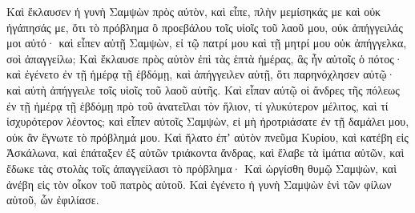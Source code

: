 {Καὶ ἔκλαυσεν ἡ γυνὴ Σαμψὼν πρὸς αὐτὸν, καὶ εἶπε, πλὴν μεμίσηκάς με καὶ οὐκ ἠγάπησάς με, ὅτι τὸ πρόβλημα ὃ προεβάλου τοῖς υἱοῖς τοῦ λαοῦ μου, οὐκ ἀπήγγειλάς μοι αὐτό· καὶ εἶπεν αὐτῇ Σαμψὼν, εἰ τῷ πατρί μου καὶ τῇ μητρί μου οὐκ ἀπήγγελκα, σοὶ ἀπαγγείλω;
Καὶ ἔκλαυσε πρὸς αὐτὸν ἐπὶ τὰς ἑπτὰ ἡμέρας, ἃς ἦν αὐτοῖς ὁ πότος· καὶ ἐγένετο ἐν τῇ ἡμέρᾳ τῇ ἑβδόμῃ, καὶ ἀπήγγειλεν αὐτῇ, ὅτι παρηνόχλησεν αὐτῷ· καὶ αὐτὴ ἀπήγγειλε τοῖς υἱοῖς τοῦ λαοῦ αὐτῆς.
Καὶ εἶπαν αὐτῷ οἱ ἄνδρες τῆς πόλεως ἐν τῇ ἡμέρᾳ τῇ ἑβδόμῃ πρὸ τοῦ ἀνατεῖλαι τὸν ἥλιον, τί γλυκύτερον μέλιτος, καὶ τί ἰσχυρότερον λέοντος; καὶ εἶπεν αὐτοῖς Σαμψὼν, εἰ μὴ ἠροτριάσατε ἐν τῇ δαμάλει μου, οὐκ ἂν ἔγνωτε τὸ πρόβλημά μου.
Καὶ ἥλατο ἐπʼ αὐτὸν πνεῦμα Κυρίου, καὶ κατέβη εἰς Ἀσκάλωνα, καὶ ἐπάταξεν ἐξ αὐτῶν τριάκοντα ἄνδρας, καὶ ἔλαβε τὰ ἱμάτια αὐτῶν, καὶ ἔδωκε τὰς στολὰς τοῖς ἀπαγγείλασι τὸ πρόβλημα· Καὶ ὠργίσθη θυμῷ Σαμψὼν, καὶ ἀνέβη εἰς τὸν οἶκον τοῦ πατρὸς αὐτοῦ.
Καὶ ἐγένετο ἡ γυνὴ Σαμψὼν ἑνὶ τῶν φίλων αὐτοῦ, ὧν ἐφιλίασε.

}
